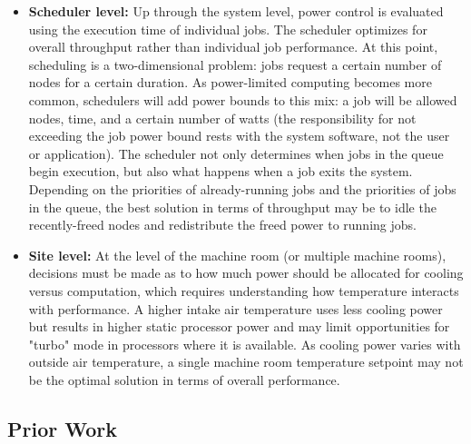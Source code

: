 \begin{itemize}
\item \textbf{Scheduler level:} Up through the system level, power control is evaluated
using the execution time of individual jobs. The scheduler optimizes for overall throughput
rather than individual job performance. At this point, scheduling is a two-dimensional 
problem: jobs request a certain number of nodes for a certain duration. As power-limited
computing becomes more common, schedulers will add power bounds to this mix: a job will
be allowed nodes, time, and a certain number of watts (the responsibility for not exceeding
the job power bound rests with the system software, not the user or application). The 
scheduler not only determines when jobs in the queue begin execution, but also what happens
when a job exits the system. Depending on the priorities of already-running jobs and the
priorities of jobs in the queue, the best solution in terms of throughput may be to idle
the recently-freed nodes and redistribute the freed power to running jobs.

\item \textbf{Site level:} At the level of the machine room (or multiple machine rooms),
decisions must be made as to how much power should be allocated for cooling versus computation, which requires understanding how temperature interacts with performance. A higher intake air temperature uses less cooling power but results in higher static processor power and may limit opportunities for "turbo" mode in processors where it is available. As cooling power varies with outside air temperature, a single machine room temperature setpoint may not be the optimal solution in terms of overall performance. 
\end{itemize}



\subsection{Prior Work}
\label{sub:priorwork}


